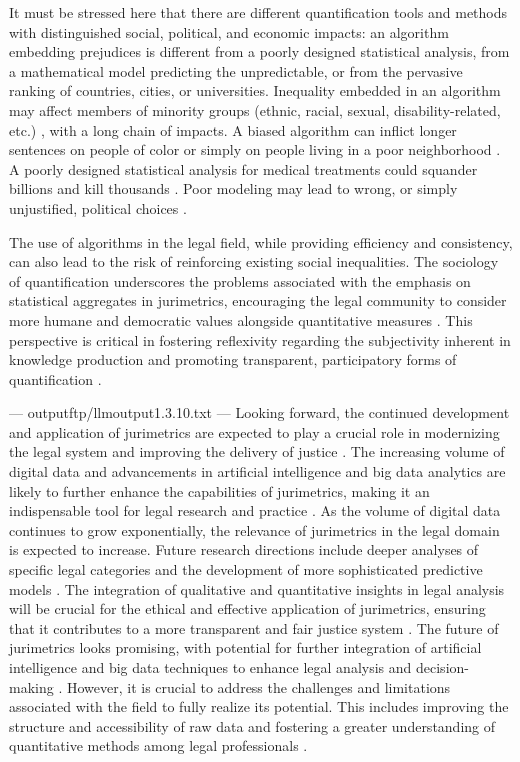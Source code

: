 It must be stressed here that there are different quantification tools and methods with distinguished social, political, and economic impacts: an algorithm embedding prejudices is different from a poorly designed statistical analysis, from a mathematical model predicting the unpredictable, or from the pervasive ranking of countries, cities, or universities. Inequality embedded in an algorithm may affect members of minority groups (ethnic, racial, sexual, disability-related, etc.) \cite{danaher2017}, with a long chain of impacts. A biased algorithm can inflict longer sentences on people of color or simply on people living in a poor neighborhood \cite{o'neil2016, muller2018}. A poorly designed statistical analysis for medical treatments could squander billions and kill thousands \cite{harris2017}. Poor modeling may lead to wrong, or simply unjustified, political choices \cite{saltelli2019a, saltelli2020, saltelli2020b}.

The use of algorithms in the legal field, while providing efficiency and consistency, can also lead to the risk of reinforcing existing social inequalities. The sociology of quantification underscores the problems associated with the emphasis on statistical aggregates in jurimetrics, encouraging the legal community to consider more humane and democratic values alongside quantitative measures \cite{10.5040/9781350220645,10.1057/s41599-020-0396-5,difioreet+alchallengequantificationinterdisciplinaryreading2022}. This perspective is critical in fostering reflexivity regarding the subjectivity inherent in knowledge production and promoting transparent, participatory forms of quantification \cite{10.1007/s11186-021-09453-1,1023071190721}.


---
outputftp/llmoutput1.3.10.txt
---
Looking forward, the continued development and application of jurimetrics are expected to play a crucial role in modernizing the legal system and improving the delivery of justice \cite{silva2023role}. The increasing volume of digital data and advancements in artificial intelligence and big data analytics are likely to further enhance the capabilities of jurimetrics, making it an indispensable tool for legal research and practice \cite{silva2023role}. As the volume of digital data continues to grow exponentially, the relevance of jurimetrics in the legal domain is expected to increase. Future research directions include deeper analyses of specific legal categories and the development of more sophisticated predictive models \cite{silva2023role}. The integration of qualitative and quantitative insights in legal analysis will be crucial for the ethical and effective application of jurimetrics, ensuring that it contributes to a more transparent and fair justice system \cite{silva2023role, zabala2019d}. The future of jurimetrics looks promising, with potential for further integration of artificial intelligence and big data techniques to enhance legal analysis and decision-making \cite{silva2023role}. However, it is crucial to address the challenges and limitations associated with the field to fully realize its potential. This includes improving the structure and accessibility of raw data and fostering a greater understanding of quantitative methods among legal professionals \cite{l2010de}.


